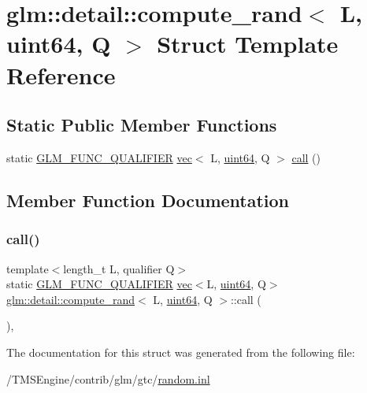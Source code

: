 \hypertarget{structglm_1_1detail_1_1compute__rand_3_01_l_00_01uint64_00_01_q_01_4}{}\section{glm\+:\+:detail\+:\+:compute\+\_\+rand$<$ L, uint64, Q $>$ Struct Template Reference}
\label{structglm_1_1detail_1_1compute__rand_3_01_l_00_01uint64_00_01_q_01_4}
\subsection*{Static Public Member Functions}
\begin{DoxyCompactItemize}
\item 
static \hyperlink{setup_8hpp_a33fdea6f91c5f834105f7415e2a64407}{G\+L\+M\+\_\+\+F\+U\+N\+C\+\_\+\+Q\+U\+A\+L\+I\+F\+I\+ER} \hyperlink{structglm_1_1vec}{vec}$<$ L, \hyperlink{namespaceglm_1_1detail_adec4b19bf4982125e122db2fe03c5810}{uint64}, Q $>$ \hyperlink{structglm_1_1detail_1_1compute__rand_3_01_l_00_01uint64_00_01_q_01_4_a2191af23ff15cf401dcc9219cb012723}{call} ()
\end{DoxyCompactItemize}


\subsection{Member Function Documentation}
\mbox{\label{structglm_1_1detail_1_1compute__rand_3_01_l_00_01uint64_00_01_q_01_4_a2191af23ff15cf401dcc9219cb012723}} 
\subsubsection{\texorpdfstring{call()}{call()}}
{\footnotesize\ttfamily template$<$length\+\_\+t L, qualifier Q$>$ \\
static \hyperlink{setup_8hpp_a33fdea6f91c5f834105f7415e2a64407}{G\+L\+M\+\_\+\+F\+U\+N\+C\+\_\+\+Q\+U\+A\+L\+I\+F\+I\+ER} \hyperlink{structglm_1_1vec}{vec}$<$L, \hyperlink{namespaceglm_1_1detail_adec4b19bf4982125e122db2fe03c5810}{uint64}, Q$>$ \hyperlink{structglm_1_1detail_1_1compute__rand}{glm\+::detail\+::compute\+\_\+rand}$<$ L, \hyperlink{namespaceglm_1_1detail_adec4b19bf4982125e122db2fe03c5810}{uint64}, Q $>$\+::call (\begin{DoxyParamCaption}{ }\end{DoxyParamCaption})\hspace{0.3cm}{\ttfamily [inline]}, {\ttfamily [static]}}



The documentation for this struct was generated from the following file\+:\begin{DoxyCompactItemize}
\item 
/\+T\+M\+S\+Engine/contrib/glm/gtc/\hyperlink{random_8inl}{random.\+inl}\end{DoxyCompactItemize}
